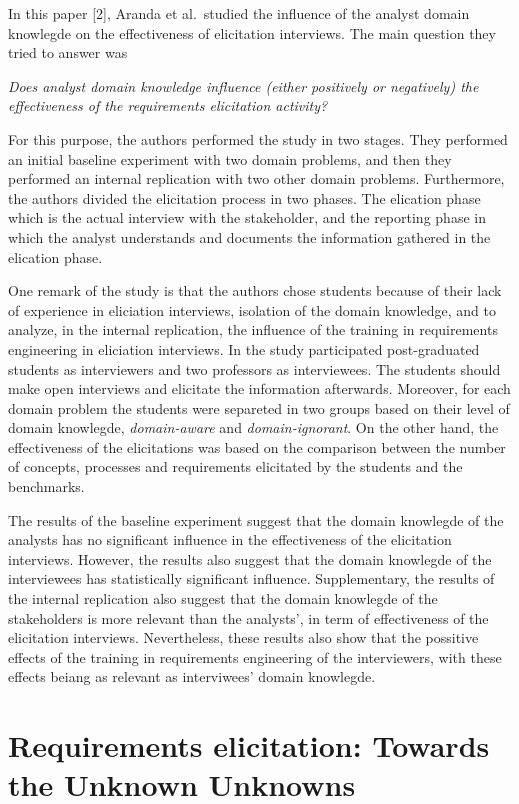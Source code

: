 \documentclass[]{llncs}
\begin{document}
In this paper {[}2{]}, Aranda et al.~studied the influence of the
analyst domain knowlegde on the effectiveness of elicitation interviews.
The main question they tried to answer was

\emph{Does analyst domain knowledge influence (either positively or
negatively) the effectiveness of the requirements elicitation activity?}

For this purpose, the authors performed the study in two stages. They
performed an initial baseline experiment with two domain problems, and
then they performed an internal replication with two other domain
problems. Furthermore, the authors divided the elicitation process in
two phases. The elication phase which is the actual interview with the
stakeholder, and the reporting phase in which the analyst understands
and documents the information gathered in the elication phase.

One remark of the study is that the authors chose students because of
their lack of experience in eliciation interviews, isolation of the
domain knowledge, and to analyze, in the internal replication, the
influence of the training in requirements engineering in eliciation
interviews. In the study participated post-graduated students as
interviewers and two professors as interviewees. The students should
make open interviews and elicitate the information afterwards. Moreover,
for each domain problem the students were separeted in two groups based
on their level of domain knowlegde, \emph{domain-aware} and
\emph{domain-ignorant}. On the other hand, the effectiveness of the
elicitations was based on the comparison between the number of concepts,
processes and requirements elicitated by the students and the
benchmarks.

The results of the baseline experiment suggest that the domain knowlegde
of the analysts has no significant influence in the effectiveness of the
elicitation interviews. However, the results also suggest that the
domain knowlegde of the interviewees has statistically significant
influence. Supplementary, the results of the internal replication also
suggest that the domain knowlegde of the stakeholders is more relevant
than the analysts', in term of effectiveness of the elicitation
interviews. Nevertheless, these results also show that the possitive
effects of the training in requirements engineering of the interviewers,
with these effects beiang as relevant as interviwees' domain knowlegde.

\hypertarget{requirements-elicitation-towards-the-unknown-unknowns}{%
\section{Requirements elicitation: Towards the Unknown
Unknowns}\label{requirements-elicitation-towards-the-unknown-unknowns}}
\end{document}
